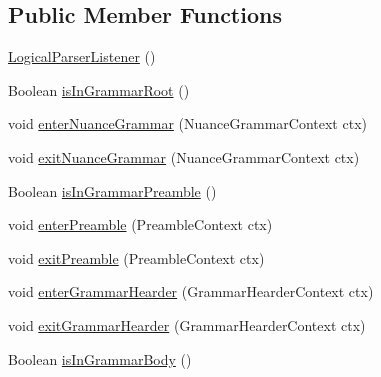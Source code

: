 \subsection*{Public Member Functions}
\begin{DoxyCompactItemize}
\item 
\hyperlink{classit_1_1emarolab_1_1cagg_1_1core_1_1language_1_1parser_1_1ANTLRInterface_1_1LogicalParserListener_a04b67187eb5ceedb974bae64f44df62a}{Logical\-Parser\-Listener} ()
\item 
Boolean \hyperlink{classit_1_1emarolab_1_1cagg_1_1core_1_1language_1_1parser_1_1ANTLRInterface_1_1LogicalParserListener_a2fd7f67ad1ff64cb1c82b758e95505d9}{is\-In\-Grammar\-Root} ()
\item 
void \hyperlink{classit_1_1emarolab_1_1cagg_1_1core_1_1language_1_1parser_1_1ANTLRInterface_1_1LogicalParserListener_af66b3fb036f22cb87fc70228ebfbc9c3}{enter\-Nuance\-Grammar} (Nuance\-Grammar\-Context ctx)
\item 
void \hyperlink{classit_1_1emarolab_1_1cagg_1_1core_1_1language_1_1parser_1_1ANTLRInterface_1_1LogicalParserListener_a806105b791aef871fe7152fe4b935b45}{exit\-Nuance\-Grammar} (Nuance\-Grammar\-Context ctx)
\item 
Boolean \hyperlink{classit_1_1emarolab_1_1cagg_1_1core_1_1language_1_1parser_1_1ANTLRInterface_1_1LogicalParserListener_a4b294954525badd9cb4d787be5cabfc2}{is\-In\-Grammar\-Preamble} ()
\item 
void \hyperlink{classit_1_1emarolab_1_1cagg_1_1core_1_1language_1_1parser_1_1ANTLRInterface_1_1LogicalParserListener_a6c2f37e90c25bcfd418df3b5e9f64eb2}{enter\-Preamble} (Preamble\-Context ctx)
\item 
void \hyperlink{classit_1_1emarolab_1_1cagg_1_1core_1_1language_1_1parser_1_1ANTLRInterface_1_1LogicalParserListener_a7c71fdd55848e72a3896cc5590c00970}{exit\-Preamble} (Preamble\-Context ctx)
\item 
void \hyperlink{classit_1_1emarolab_1_1cagg_1_1core_1_1language_1_1parser_1_1ANTLRInterface_1_1LogicalParserListener_a5ed55a36fc6f77b3d455c08f1ef6a36f}{enter\-Grammar\-Hearder} (Grammar\-Hearder\-Context ctx)
\item 
void \hyperlink{classit_1_1emarolab_1_1cagg_1_1core_1_1language_1_1parser_1_1ANTLRInterface_1_1LogicalParserListener_a136894e821f25bd8b9bc78f65cd3a6cd}{exit\-Grammar\-Hearder} (Grammar\-Hearder\-Context ctx)
\item 
Boolean \hyperlink{classit_1_1emarolab_1_1cagg_1_1core_1_1language_1_1parser_1_1ANTLRInterface_1_1LogicalParserListener_a8d3ea8540f3041cd39900d56c5160b54}{is\-In\-Grammar\-Body} ()

\end{DoxyCompactItemize}
